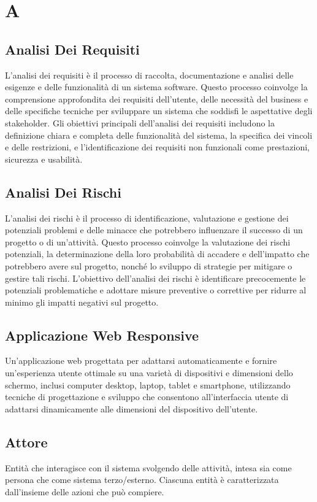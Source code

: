 \section{A} 
\subsection{Analisi Dei Requisiti} 
L'analisi dei requisiti è il processo di raccolta, documentazione e analisi delle esigenze e delle funzionalità di un sistema software. Questo processo coinvolge la comprensione approfondita dei requisiti dell'utente, delle necessità del business e delle specifiche tecniche per sviluppare un sistema che soddisfi le aspettative degli stakeholder. Gli obiettivi principali dell'analisi dei requisiti includono la definizione chiara e completa delle funzionalità del sistema, la specifica dei vincoli e delle restrizioni, e l'identificazione dei requisiti non funzionali come prestazioni, sicurezza e usabilità.
\subsection{Analisi Dei Rischi} 
L'analisi dei rischi è il processo di identificazione, valutazione e gestione dei potenziali problemi e delle minacce che potrebbero influenzare il successo di un progetto o di un'attività. Questo processo coinvolge la valutazione dei rischi potenziali, la determinazione della loro probabilità di accadere e dell'impatto che potrebbero avere sul progetto, nonché lo sviluppo di strategie per mitigare o gestire tali rischi. L'obiettivo dell'analisi dei rischi è identificare precocemente le potenziali problematiche e adottare misure preventive o correttive per ridurre al minimo gli impatti negativi sul progetto.
\subsection{Applicazione Web Responsive} 
Un'applicazione web progettata per adattarsi automaticamente e fornire un'esperienza utente ottimale su una varietà di dispositivi e dimensioni dello schermo, inclusi computer desktop, laptop, tablet e smartphone, utilizzando tecniche di progettazione e sviluppo che consentono all'interfaccia utente di adattarsi dinamicamente alle dimensioni del dispositivo dell'utente.
\subsection{Attore} 
Entità che interagisce con il sistema svolgendo delle attività, intesa sia come persona che come sistema terzo/esterno. Ciascuna entità è caratterizzata dall’insieme delle azioni che può compiere.

